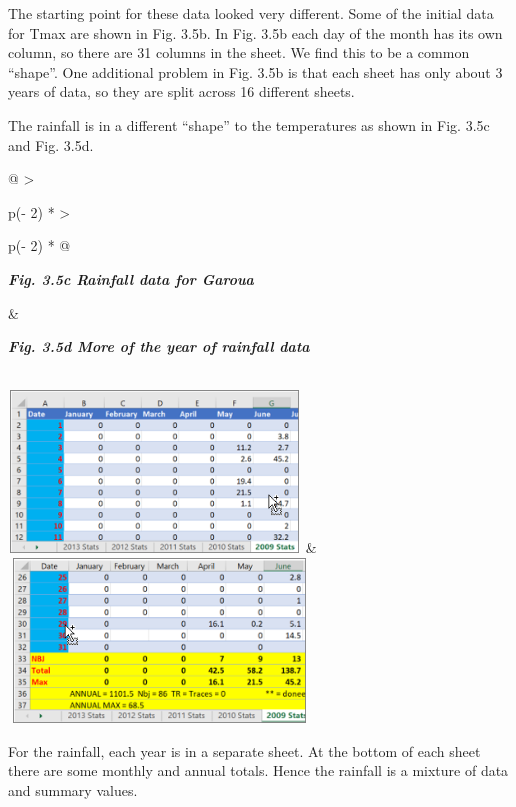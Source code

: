 \documentclass[
  letterpaper,
  DIV=11,
  numbers=noendperiod]{scrreprt}
\begin{document}
The starting point for these data looked very different. Some of the
initial data for Tmax are shown in Fig. 3.5b. In Fig. 3.5b each day of
the month has its own column, so there are 31 columns in the sheet. We
find this to be a common ``shape''. One additional problem in Fig. 3.5b
is that each sheet has only about 3 years of data, so they are split
across 16 different sheets.

The rainfall is in a different ``shape'' to the temperatures as shown in
Fig. 3.5c and Fig. 3.5d.

\begin{longtable}[]{@{}
  >{\raggedright\arraybackslash}p{(\columnwidth - 2\tabcolsep) * }
  >{\raggedright\arraybackslash}p{(\columnwidth - 2\tabcolsep) * }@{}}
\toprule\noalign{}
\begin{minipage}[b]{\linewidth}\raggedright
\textbf{\emph{Fig. 3.5c Rainfall data for Garoua}}
\end{minipage} & \begin{minipage}[b]{\linewidth}\raggedright
\textbf{\emph{Fig. 3.5d More of the year of rainfall data}}
\end{minipage} \\
\midrule\noalign{}
\endhead
\bottomrule\noalign{}
\endlastfoot
\includegraphics[width=3.05325in,height=1.69806in]{figures/Fig3.5c.png}
&
\includegraphics[width=3.16018in,height=1.72026in]{figures/Fig3.5d.png} \\
\end{longtable}

For the rainfall, each year is in a separate sheet. At the bottom of
each sheet there are some monthly and annual totals. Hence the rainfall
is a mixture of data and summary values.
\end{document}
